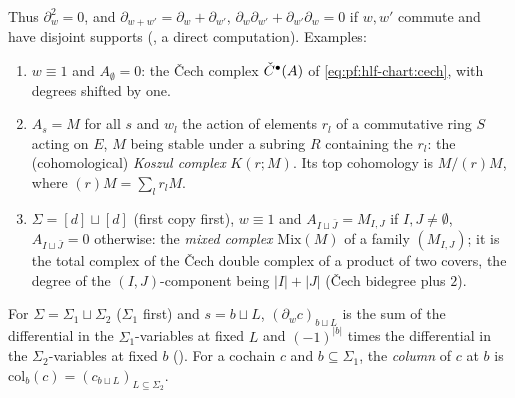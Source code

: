 Thus $\partial_w^2=0$, and $\partial_{w+w'}=\partial_w+\partial_{w'}$, $\partial_w\partial_{w'}+\partial_{w'}\partial_w=0$ if $w,w'$ commute and have
disjoint supports (, a direct computation). Examples:
\begin{enumerate}[label=(\roman*),nosep]
\item $w\equiv1$ and $A_\emptyset=0$: the \v{C}ech complex $\check{C}^\bullet(A)$ of \eqref{eq:pf:hlf-chart:cech}, with degrees shifted by one.
\item $A_s=M$ for all $s$ and $w_l$ the action of elements $r_l$ of a commutative ring $S$ acting on $E$, $M$ being stable under a subring $R$
containing the $r_l$: the (cohomological) \emph{Koszul complex} $K(r;M)$. Its top cohomology is $M/(r)M$, where $(r)M=\sum_lr_lM$.
\item $\Sigma=[d]\sqcup[d]$ (first copy first), $w\equiv1$ and $A_{I\sqcup\bar J}=M_{I,J}$ if $I,J\ne\emptyset$, $A_{I\sqcup\bar J}=0$ otherwise:
the \emph{mixed complex} $\mathrm{Mix}(M)$ of a family $(M_{I,J})$; it is the total complex of the \v{C}ech double complex of a product of two
covers, the degree of the $(I,J)$-component being $|I|+|J|$ (\v{C}ech bidegree plus $2$).
\end{enumerate}
For $\Sigma=\Sigma_1\sqcup\Sigma_2$ ($\Sigma_1$ first) and $s=b\sqcup L$, $(\partial_wc)_{b\sqcup L}$ is the sum of the differential in the
$\Sigma_1$-variables at fixed $L$ and $(-1)^{|b|}$ times the differential in the $\Sigma_2$-variables at fixed $b$
(). For a cochain $c$ and $b\subseteq\Sigma_1$, the \emph{column} of $c$ at $b$ is
$\mathrm{col}_b(c)=(c_{b\sqcup L})_{L\subseteq\Sigma_2}$.


